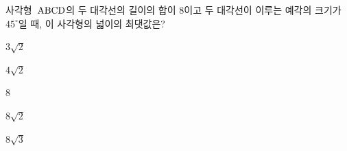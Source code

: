 사각형~$\mathrm{ABCD}$의 두 대각선의 길이의 합이 $8$이고 두 대각선이 이루는 예각의 크기가 $45^\circ$일 때, 이 사각형의 넓이의 최댓값은?
\begin{choices32}{\rule[-3ex]{0pt}{8ex}$3\sqrt{2}$}{\rule[-3ex]{0pt}{8ex}$4\sqrt{2}$}{\rule[-3ex]{0pt}{8ex}$8$}{\rule[-3ex]{0pt}{8ex}$8\sqrt{2}$}{\rule[-3ex]{0pt}{8ex}$8\sqrt{3}$}\end{choices32}
